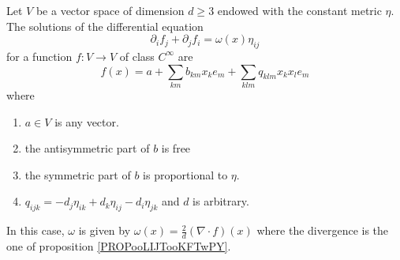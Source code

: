 \begin{lemma}
    Let \( V\) be a vector space of dimension \( d\geq 3\) endowed with the constant metric \( \eta\). The solutions of the differential equation
    \begin{equation}    \label{EQooVBIMooOBKAKQ}
        \partial_if_j+\partial_jf_i=\omega(x)\eta_{ij}
    \end{equation}
    for a function \( f\colon V\to V\) of class \(  C^{\infty}\) are
    \begin{equation}    \label{EQooEFOMooUhcgfT}
        f(x)=a+\sum_{km}b_{km}x_ke_m+\sum_{klm}q_{klm}x_kx_le_m
    \end{equation}
    where
    \begin{enumerate}
        \item
            \( a\in V\) is any vector.
        \item
            the antisymmetric part of \( b\) is free
        \item
            the symmetric part of \( b\) is proportional to \( \eta\).
        \item
            \( q_{ijk}=-d_j\eta_{ik}+d_k\eta_{ij}-d_i\eta_{jk}\) and \( d\) is arbitrary.
    \end{enumerate}
    In this case, \( \omega\) is given by \( \omega(x)=\frac{ 2 }{ d }(\nabla\cdot f)(x)\) where the divergence is the one of proposition \ref{PROPooLIJTooKFTwPY}.
\end{lemma}

